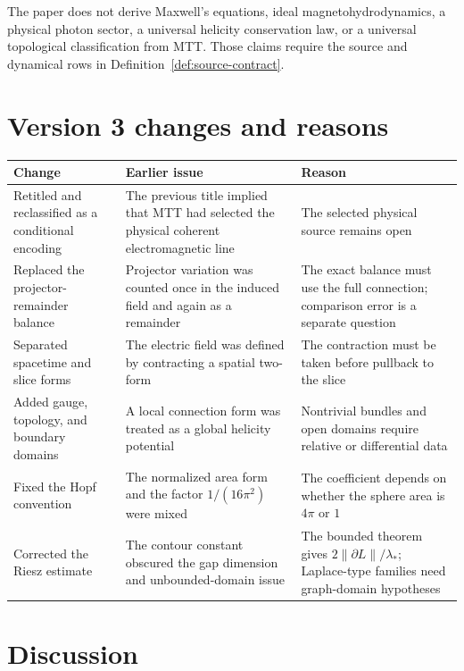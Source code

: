 \documentclass[11pt]{article}
\begin{document}
The paper does not derive Maxwell's equations, ideal magnetohydrodynamics, a
physical photon sector, a universal helicity conservation law, or a universal
topological classification from MTT.  Those claims require the source and
dynamical rows in Definition~\ref{def:source-contract}.

\section{Version 3 changes and reasons}

\begin{center}
\small
\begin{tabular}{>{\raggedright\arraybackslash}p{}
                >{\raggedright\arraybackslash}p{}
                >{\raggedright\arraybackslash}p{}}
\toprule
Change & Earlier issue & Reason \\
\midrule
Retitled and reclassified as a conditional encoding &
The previous title implied that MTT had selected the physical coherent
electromagnetic line &
The selected physical source remains open \\
\addlinespace
Replaced the projector-remainder balance &
Projector variation was counted once in the induced field and again as a
remainder &
The exact balance must use the full connection; comparison error is a separate
question \\
\addlinespace
Separated spacetime and slice forms &
The electric field was defined by contracting a spatial two-form &
The contraction must be taken before pullback to the slice \\
\addlinespace
Added gauge, topology, and boundary domains &
A local connection form was treated as a global helicity potential &
Nontrivial bundles and open domains require relative or differential data \\
\addlinespace
Fixed the Hopf convention &
The normalized area form and the factor \(1/(16\pi^2)\) were mixed &
The coefficient depends on whether the sphere area is \(4\pi\) or \(1\) \\
\addlinespace
Corrected the Riesz estimate &
The contour constant obscured the gap dimension and unbounded-domain issue &
The bounded theorem gives \(2\|\partial L\|/\lambda_*\); Laplace-type families
need graph-domain hypotheses \\
\bottomrule
\end{tabular}
\end{center}

\section{Discussion}
\end{document}
